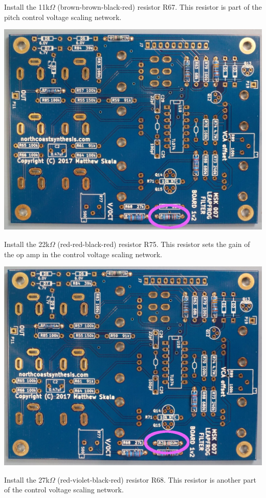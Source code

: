 Install the 11k$\Omega$ (brown-brown-black-red) resistor R67.
This resistor is part of the pitch control voltage scaling network.

\nopagebreak
\noindent\includegraphics[width=\linewidth]{res-11k1.jpg}

\pagebreak

Install the 22k$\Omega$ (red-red-black-red) resistor R75.
This resistor sets the gain of the op amp in the control voltage scaling
network.

\nopagebreak
\noindent\includegraphics[width=\linewidth]{res-22k1.jpg}

Install the 27k$\Omega$ (red-violet-black-red) resistor R68.
This resistor is another part of the control voltage scaling network.


